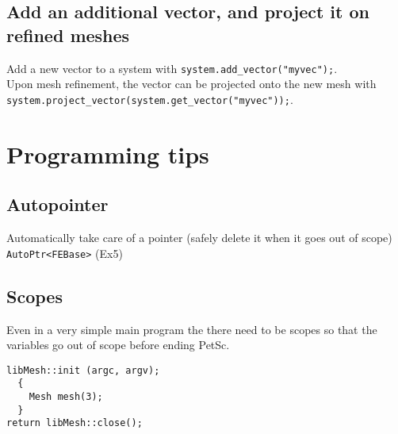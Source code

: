 \documentclass{article}
\newcommand{\exmp}[1]{\textsf{Ex#1}}
\newcommand{\code}[1]{\texttt{#1}}
\begin{document}
\subsection{Add an additional vector, and project it on refined meshes}
\label{sec:add_vector}

Add a new vector to a system with \code{system.add\_vector("myvec");}. \\ Upon
mesh refinement, the vector can be projected onto the new mesh with
\code{system.project\_vector(system.get\_vector("myvec"));}.


\section{Programming tips}
\label{sec:programming-tips}

\subsection{Autopointer}
\label{sec:autopointer}

Automatically take care of a pointer (safely delete it when it goes out of
scope) \code{AutoPtr<FEBase>} (\exmp{5})

\subsection{Scopes}
\label{sec:scopes}

Even in a very simple main program the there need to be scopes so that
the variables go out of scope before ending PetSc.

\begin{lstlisting}
libMesh::init (argc, argv);
  {
    Mesh mesh(3);
  }
return libMesh::close();
\end{lstlisting}
\end{document}
